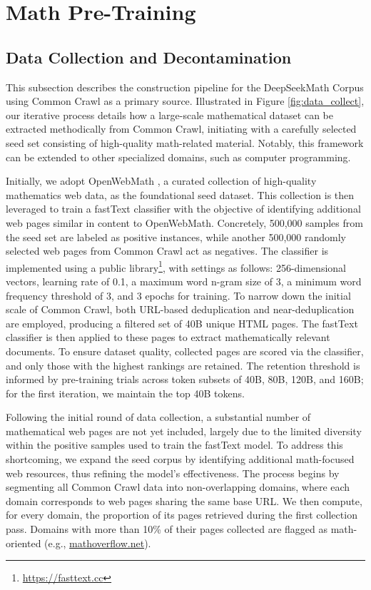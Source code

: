 \section{Math Pre-Training}

\subsection{Data Collection and Decontamination} This subsection describes the construction pipeline for the DeepSeekMath Corpus using Common Crawl as a primary source. Illustrated in Figure \ref{fig:data_collect}, our iterative process details how a large-scale mathematical dataset can be extracted methodically from Common Crawl, initiating with a carefully selected seed set consisting of high-quality math-related material. Notably, this framework can be extended to other specialized domains, such as computer programming.

Initially, we adopt OpenWebMath \citep{openwebmath}, a curated collection of high-quality mathematics web data, as the foundational seed dataset. This collection is then leveraged to train a fastText classifier \citep{joulin2016fasttext} with the objective of identifying additional web pages similar in content to OpenWebMath. Concretely, 500,000 samples from the seed set are labeled as positive instances, while another 500,000 randomly selected web pages from Common Crawl act as negatives. The classifier is implemented using a public library\footnote{\url{https://fasttext.cc}}, with settings as follows: 256-dimensional vectors, learning rate of 0.1, a maximum word n-gram size of 3, a minimum word frequency threshold of 3, and 3 epochs for training. To narrow down the initial scale of Common Crawl, both URL-based deduplication and near-deduplication are employed, producing a filtered set of 40B unique HTML pages. The fastText classifier is then applied to these pages to extract mathematically relevant documents. To ensure dataset quality, collected pages are scored via the classifier, and only those with the highest rankings are retained. The retention threshold is informed by pre-training trials across token subsets of 40B, 80B, 120B, and 160B; for the first iteration, we maintain the top 40B tokens.

Following the initial round of data collection, a substantial number of mathematical web pages are not yet included, largely due to the limited diversity within the positive samples used to train the fastText model. To address this shortcoming, we expand the seed corpus by identifying additional math-focused web resources, thus refining the model’s effectiveness. The process begins by segmenting all Common Crawl data into non-overlapping domains, where each domain corresponds to web pages sharing the same base URL. We then compute, for every domain, the proportion of its pages retrieved during the first collection pass. Domains with more than 10\% of their pages collected are flagged as math-oriented (e.g., \url{mathoverflow.net}).


